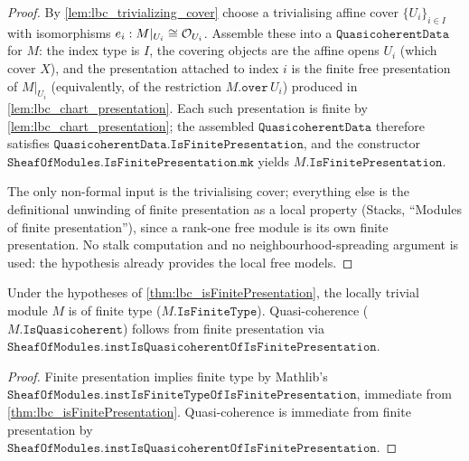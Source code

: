 \begin{proof}
  \leanok
  By \cref{lem:lbc_trivializing_cover} choose a trivialising affine cover
  \(\{U_i\}_{i \in I}\) with isomorphisms \(e_i : M|_{U_i} \cong \mathcal{O}_{U_i}\).
  Assemble these into a \(\mathtt{QuasicoherentData}\) for \(M\): the index type
  is \(I\), the covering objects are the affine opens \(U_i\) (which cover \(X\)),
  and the presentation attached to index \(i\) is the finite free presentation of
  \(M|_{U_i}\) (equivalently, of the restriction \(M.\mathtt{over}\,U_i\))
  produced in \cref{lem:lbc_chart_presentation}. Each such presentation is
  finite by \cref{lem:lbc_chart_presentation}; the assembled
  \(\mathtt{QuasicoherentData}\) therefore satisfies
  \(\mathtt{QuasicoherentData.IsFinitePresentation}\), and the constructor
  \(\mathtt{SheafOfModules.IsFinitePresentation.mk}\) yields
  \(M.\mathtt{IsFinitePresentation}\).

  The only non-formal input is the trivialising cover; everything else is the
  definitional unwinding of finite presentation as a local property
  (Stacks, ``Modules of finite presentation''), since a rank-one free module is its own finite
  presentation. No stalk computation and no neighbourhood-spreading argument is
  used: the hypothesis already provides the local free models.
\end{proof}

\begin{corollary}\leanok
  \label{cor:lbc_isFiniteType}
  Under the hypotheses of \cref{thm:lbc_isFinitePresentation}, the locally
  trivial module \(M\) is of finite type (\(M.\mathtt{IsFiniteType}\)). Quasi-coherence
  (\(M.\mathtt{IsQuasicoherent}\)) follows from finite presentation via
  \(\mathtt{SheafOfModules.instIsQuasicoherentOfIsFinitePresentation}\).
\end{corollary}

\begin{proof}
  \leanok
  Finite presentation implies finite type by Mathlib's
  \(\mathtt{SheafOfModules.instIsFiniteTypeOfIsFinitePresentation}\), immediate
  from \cref{thm:lbc_isFinitePresentation}. Quasi-coherence is immediate from
  finite presentation by
  \(\mathtt{SheafOfModules.instIsQuasicoherentOfIsFinitePresentation}\).
\end{proof}

